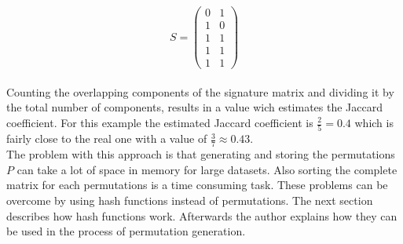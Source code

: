 \begin{equation}
    S = 
    \begin{pmatrix}
        0 & 1 \\
        1 & 0 \\
        1 & 1 \\
        1 & 1 \\
        1 & 1
    \end{pmatrix}
\end{equation} \\

Counting the overlapping components of the signature matrix and dividing it by the total number of components, results in a value wich estimates the Jaccard coefficient. For this example the estimated Jaccard coefficient is $ \frac{2}{5} = 0.4 $ which is fairly close to the real one with a value of $ \frac{3}{7} \approx 0.43 $.\\

The problem with this approach is that generating and storing the permutations $ P $ can take a lot of space in memory for large datasets. Also sorting the complete matrix for each permutations is a time consuming task. These problems can be overcome by using hash functions instead of permutations. The next section describes how hash functions work. Afterwards the author explains how they can be used in the process of permutation generation.\\